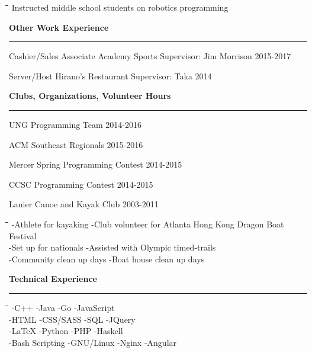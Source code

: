 \documentclass[12pt,letterpaper]{letter}
\begin{document}
\begin{tabbing}
\hspace*{2cm}\=\hspace*{2cm}\=\hspace*{2cm}\=\hspace*{2cm}\= \kill
\> Instructed middle school students on robotics programming\\
\end{tabbing}

\noindent\textbf{Other Work Experience}
\vspace{3pt}
\hrule \relax


Cashier/Sales Associate \hfill Academy Sports \hfill Supervisor: Jim Morrison \hfill 2015-2017

Server/Host \hfill Hirano’s Restaurant \hfill Supervisor: Taka \hfill 2014

\noindent\textbf{Clubs, Organizations, Volunteer Hours}
\vspace{3pt}
\hrule \relax

UNG Programming Team \hfill 2014-2016

\hspace*{2cm}ACM Southeast Regionals \hfill 2015-2016

\hspace*{2cm}Mercer Spring Programming Contest \hfill 2014-2015

\hspace*{2cm}CCSC Programming Contest \hfill 2014-2015

Lanier Canoe and Kayak Club \hfill 2003-2011

\begin{tabbing}
\hspace*{2cm}\=\hspace*{6cm}\=\hspace*{3cm}\=\hspace*{3cm}\= \kill
\> -Athlete for kayaking\> -Club volunteer for Atlanta Hong Kong Dragon Boat Festival\\[1ex]
\> -Set up for nationals\> -Assisted with Olympic timed-trails\\[1ex]
\> -Community clean up days\> -Boat house clean up days
\end{tabbing}

\noindent\textbf{Technical Experience}
\vspace{3pt}
\hrule \relax

\begin{tabbing}
\hspace*{2cm}\=\hspace*{4cm}\=\hspace*{4cm}\=\hspace*{4cm}\= \kill
\> -C++ \> -Java\> -Go\> -JavaScript\\[1ex]
\> -HTML\> -CSS/SASS\> -SQL\> -JQuery\\[1ex]
\> -LaTeX\> -Python\> -PHP\> -Haskell\\[1ex]
\> -Bash Scripting \> -GNU/Linux\> -Nginx\> -Angular\\[1ex]
\end{tabbing}
\end{document}
